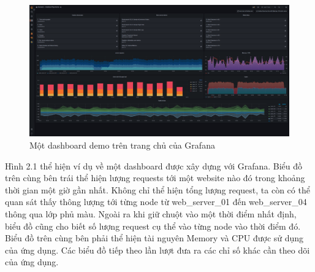 \begin{figure}[H] %
    \centering %
    \includegraphics[width=1\textwidth]{figures/fig_01.png} 
    \caption{Một dashboard demo trên trang chủ của Grafana} %
    \label{fig:fig_01}
\end{figure}
Hình 2.1 thể hiện ví dụ về một dashboard được xây dựng với Grafana. Biểu đồ trên cùng bên trái thể hiện lượng requests tới một website nào đó trong khoảng thời gian một giờ gần nhất. Không chỉ thể hiện tổng lượng request, ta còn có thể quan sát thấy thông lượng tới từng node từ web\_server\_01 đến web\_server\_04 thông qua lớp phủ màu. Ngoài ra khi giữ chuột vào một thời điểm nhất định, biểu đồ cũng cho biết số lượng request cụ thể vào từng node vào thời điểm đó. Biểu đồ trên cùng bên phải thể hiện tài nguyên Memory và CPU được sử dụng của ứng dụng. Các biểu đồ tiếp theo lần lượt đưa ra các chỉ số khác cần theo dõi của ứng dụng.

